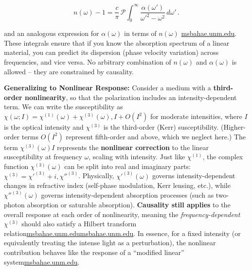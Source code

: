 \documentclass[11pt,a4paper]{article}
\begin{document}
$$
n(\omega) - 1 = \frac{c}{\pi} \, \mathcal{P}\!\int_0^{\infty} \frac{\alpha(\omega')}{\omega'^2 - \omega^2}\, d\omega'\,.
$$

and an analogous expression for $\alpha(\omega)$ in terms of $n(\omega)$ \href{https://msbahae.unm.edu/Courses/568%20Nonlinear%20Optics/OSA-Handbook%20of%20Optics-IV-Ch17.pdf}{msbahae.unm.edu}. These integrals ensure that if you know the absorption spectrum of a linear material, you can predict its dispersion (phase velocity variation) across frequencies, and vice versa. No arbitrary combination of $n(\omega)$ and $\alpha(\omega)$ is allowed – they are constrained by causality.

\textbf{Generalizing to Nonlinear Response:} Consider a medium with a \textbf{third-order nonlinearity}, so that the polarization includes an intensity-dependent term. We can write the susceptibility as $\chi(\omega; I) = \chi^{(1)}(\omega) + \chi^{(3)}(\omega),I + O(I^2)$ for moderate intensities, where $I$ is the optical intensity and $\chi^{(3)}$ is the third-order (Kerr) susceptibility. (Higher-order terms $O(I^2)$ represent fifth-order and above, which we neglect here.) The term $\chi^{(3)}(\omega)I$ represents the \textbf{nonlinear correction} to the linear susceptibility at frequency $\omega$, scaling with intensity. Just like $\chi^{(1)}$, the complex function $\chi^{(3)}(\omega)$ can be split into real and imaginary parts: $\chi^{(3)} = \chi'^{(3)} + i,\chi''^{(3)}$. Physically, $\chi'^{(3)}(\omega)$ governs intensity-dependent changes in refractive index (self-phase modulation, Kerr lensing, etc.), while $\chi''^{(3)}(\omega)$ governs intensity-dependent absorption processes (such as two-photon absorption or saturable absorption). \textbf{Causality still applies} to the overall response at each order of nonlinearity, meaning the \emph{frequency-dependent} $\chi^{(3)}$ should also satisfy a Hilbert transform relation\href{https://msbahae.unm.edu/Courses/568%20Nonlinear%20Optics/OSA-Handbook%20of%20Optics-IV-Ch17.pdf#:~:text=recently%2C however ,It is}{msbahae.unm.edu}\href{https://msbahae.unm.edu/Courses/568%20Nonlinear%20Optics/OSA-Handbook%20of%20Optics-IV-Ch17.pdf#:~:text=the fact that our new,∞ −∞ − %2B ∆}{msbahae.unm.edu}. In essence, for a fixed intensity (or equivalently treating the intense light as a perturbation), the nonlinear contribution behaves like the response of a “modified linear” system\href{https://msbahae.unm.edu/Courses/568%20Nonlinear%20Optics/OSA-Handbook%20of%20Optics-IV-Ch17.pdf#:~:text=recently%2C however ,It is}{msbahae.unm.edu}.
\end{document}
